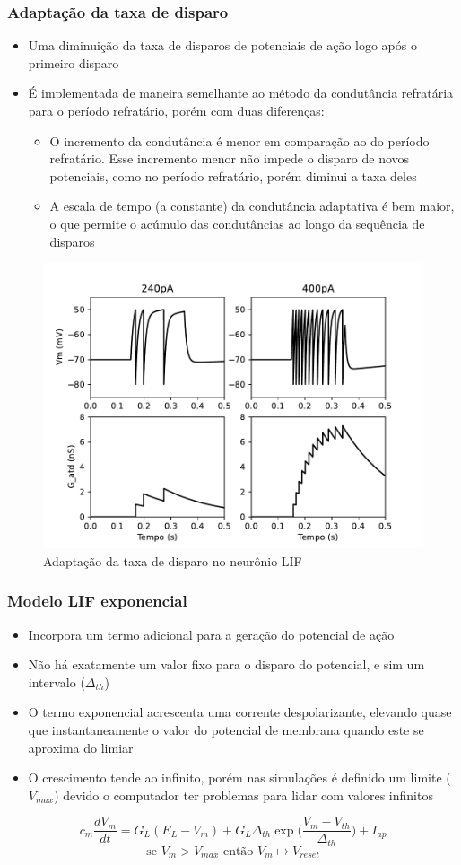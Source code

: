 \subsubsection{Adaptação da taxa de disparo}
\begin{itemize}
	\item Uma diminuição da taxa de disparos de potenciais de ação logo após o primeiro disparo
	\item É implementada de maneira semelhante ao método da condutância refratária para o período refratário, porém com duas diferenças:
	\begin{itemize}
		\item O incremento da condutância é menor em comparação ao do período refratário. Esse incremento menor não impede o disparo de novos potenciais, como no período refratário, porém diminui a taxa deles
		\item A escala de tempo (a constante) da condutância adaptativa é bem maior, o que permite o acúmulo das condutâncias ao longo da sequência de disparos
	\end{itemize}
\end{itemize}

\begin{figure}[htb!]
	\centering
	\caption{Adaptação da taxa de disparo no neurônio LIF}
	\label{fig:lifatd}
	\includegraphics[width=0.7\linewidth]{figs/lif_atd}
\end{figure}

\subsubsection{Modelo LIF exponencial}
\begin{itemize}
	\item Incorpora um termo adicional para a geração do potencial de ação
	\item Não há exatamente um valor fixo para o disparo do potencial, e sim um intervalo ($\Delta_{th}$)
	\item O termo exponencial acrescenta uma corrente despolarizante, elevando quase que instantaneamente o valor do potencial de membrana quando este se aproxima do limiar
	\item O crescimento tende ao infinito, porém nas simulações é definido um limite ($V_{max}$) devido o computador ter problemas para lidar com valores infinitos
\end{itemize}
$$
c_m\frac{dV_m}{dt} = G_L(E_L-V_m) + G_L\Delta_{th}\exp\Big(\frac{V_m-V_{th}}{\Delta_{th}}\Big) + I_{ap}
$$$$
\text{se } V_m > V_{max} \text{ então } V_m\mapsto V_{reset}
$$

